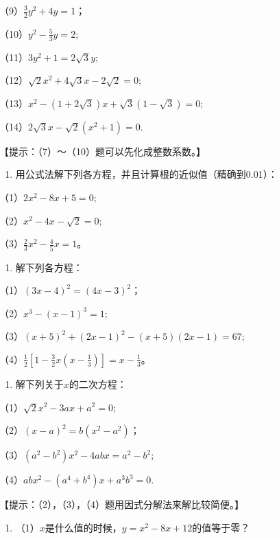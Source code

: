 （9）\(\frac{3}{2} y^2 + 4y = 1\)；

（10）\(y^{2}-\frac{5}{3}y=2;\)

（11）\(3y^{2} + 1 = 2\sqrt{3} y;\)

（12）\(\sqrt{2} x^{2} + 4\sqrt{3} x - 2\sqrt{2} = 0;\)

（13）\(x^{2} - (1 + 2\sqrt{3})x + \sqrt{3}(1 - \sqrt{3}) = 0;\)

（14）\(2\sqrt{3} x - \sqrt{2}(x^2 + 1) = 0.\)

【提示：（7）～（10）题可以先化成整数系数。】

\begin{enumerate}[start=2]
\item
  用公式法解下列各方程，并且计算根的近似值（精确到0.01）：
\end{enumerate}

（1）\(2x^{2} - 8x + 5 = 0;\)

（2）\(x^{2} - 4x - \sqrt{2} = 0;\)

（3）\(\frac{2}{3} x^2 - \frac{4}{5} x = 1\)。

\begin{enumerate}[start=8]
\item
  解下列各方程：
\end{enumerate}

（1）\((3x - 4)^{2} = (4x - 3)^{2}\)；

（2）\(x^{3} - (x - 1)^{3} = 1;\)

（3）\((x + 5)^{2} + (2x - 1)^{2} - (x + 5)(2x - 1) = 67;\)

（4）\(\frac{1}{2}\left[1 - \frac{3}{2} x\left(x - \frac{1}{3}\right)\right] = x - \frac{1}{3}\)。

\begin{enumerate}[start=4]
\item
  解下列关于\(x\)的二次方程：
\end{enumerate}

（1）\(\sqrt{2} x^{2} - 3ax + a^{2} = 0;\)

（2）\((x - a)^{2} = b(x^{2} - a^{2})\)；

（3）\((a^2 - b^2)x^2 - 4abx = a^2 - b^2;\)

（4）\(abx^{2} - (a^{4} + b^{4})x + a^{3}b^{3} = 0.\)

【提示：（2），（3），（4）题用因式分解法来解比较简便。】

\begin{enumerate}[start=5]
\item
  （1）\(x\)是什么值的时候，\(y = x^{2} - 8x + 12\)的值等于零？
\end{enumerate}

